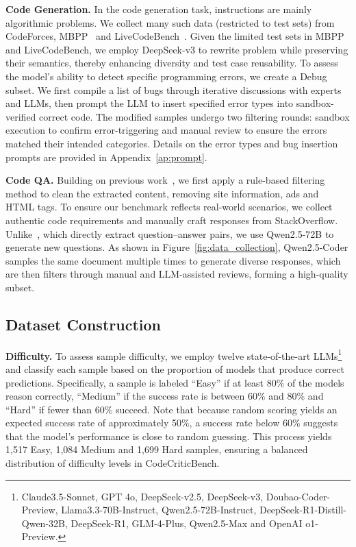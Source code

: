 \documentclass[11pt, a4paper, logo, copyright, nonumbering, amsart]{map}
\begin{document}
\begin{CJK*}{UTF8}{gbsn}
\textbf{Code Generation.} In the code generation task, instructions are mainly algorithmic problems. We collect many such data (restricted to test sets) from CodeForces, MBPP~\cite{mbpp} and LiveCodeBench~\cite{Jain2024LiveCodeBenchHA}. Given the limited test sets in MBPP and LiveCodeBench, we employ DeepSeek-v3 to rewrite problem while preserving their semantics, thereby enhancing diversity and test case reusability. To assess the model's ability to detect specific programming errors, we create a Debug subset. We first compile a list of bugs through iterative discussions with experts and LLMs, then prompt the LLM to insert specified error types into sandbox-verified correct code. The modified samples undergo two filtering rounds: sandbox execution to confirm error-triggering and manual review to ensure the errors matched their intended categories. Details on the error types and bug insertion prompts are provided in Appendix~\ref{ap:prompt}.

\noindent \textbf{Code QA.} Building on previous work~\cite{baars2019codearena}, we first apply a rule-based filtering method to clean the extracted content, removing site information, ads and HTML tags. To ensure our benchmark reflects real-world scenarios, we collect authentic code requirements and manually craft responses from StackOverflow. Unlike~\cite{yue2024mammoth2}, which directly extract question–answer pairs, we use Qwen2.5-72B to generate new questions. As shown in Figure~\ref{fig:data_collection}, Qwen2.5-Coder samples the same document multiple times to generate diverse responses, which are then filters through manual and LLM-assisted reviews, forming a high-quality subset.

\subsection{Dataset Construction}

\textbf{Difficulty.} To assess sample difficulty, we employ twelve state-of-the-art LLMs\footnote{Claude3.5-Sonnet, GPT 4o, DeepSeek-v2.5, DeepSeek-v3, Doubao-Coder-Preview, Llama3.3-70B-Instruct, Qwen2.5-72B-Instruct, DeepSeek-R1-Distill-Qwen-32B, DeepSeek-R1, GLM-4-Plus, Qwen2.5-Max and OpenAI o1-Preview.} and classify each sample based on the proportion of models that produce correct predictions. Specifically, a sample is labeled ``Easy'' if at least 80\% of the models reason correctly, ``Medium'' if the success rate is between 60\% and 80\% and ``Hard'' if fewer than 60\% succeed. Note that because random scoring yields an expected success rate of approximately 50\%, a success rate below 60\% suggests that the model's performance is close to random guessing. This process yields 1,517 Easy, 1,084 Medium and 1,699 Hard samples, ensuring a balanced distribution of difficulty levels in CodeCriticBench.


\end{CJK*}
\end{document}
